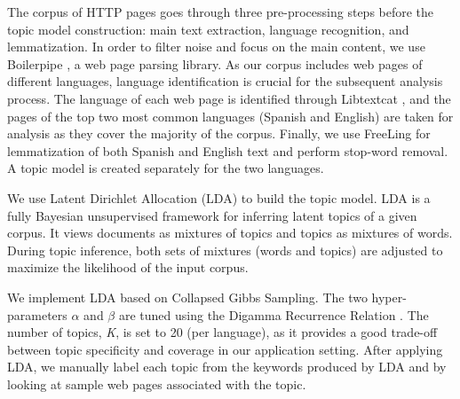 The corpus of HTTP pages goes through three pre-processing steps before the topic model construction: main text extraction, language recognition, and lemmatization. In order to filter noise and focus on the main content, we use Boilerpipe \cite{kohlschutter2010boilerplate}, a web page parsing library. As our corpus includes web pages of different languages, language identification is crucial for the subsequent analysis process. The language of each web page is identified through Libtextcat \cite{cavnar1994n}, and the pages of the top two most common languages (Spanish and English) are taken for analysis as they cover the majority of the corpus. Finally, we use FreeLing \cite{carreras2004freeling} for lemmatization of both Spanish and English text and perform stop-word removal. A topic model is created separately for the two languages. 

We use Latent Dirichlet Allocation (LDA) \cite{blei2003latent} to build the topic model. LDA is a fully Bayesian unsupervised framework for inferring latent topics of a given corpus. It views documents as mixtures of topics and topics as mixtures of words. During topic inference, both sets of mixtures (words and topics) are adjusted to maximize the likelihood of the input corpus. 

We implement LDA based on Collapsed Gibbs Sampling. The two hyper-parameters $\alpha$ and $\beta$ are tuned using the Digamma Recurrence Relation \cite{breiman2001random}. The number of topics, \textit{K}, is set to 20 (per language), as it provides a good trade-off between topic specificity and coverage in our application setting. After applying LDA, we manually label each topic from the keywords produced by LDA and by looking at sample web pages associated with the topic. 

